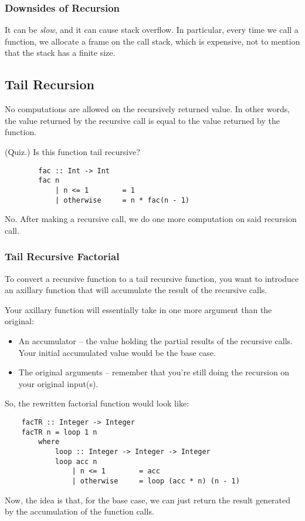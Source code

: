 \documentclass[letterpaper]{article}
\begin{document}
\subsubsection{Downsides of Recursion}
It can be \emph{slow}, and it can cause stack overflow. In particular, every time we call a function, we allocate a frame on the call stack, which is expensive, not to mention that the stack has a finite size. 

\subsection{Tail Recursion}
No computations are allowed on the recursively returned value. In other words, the value returned by the recursive call is equal to the value returned by the function. 

\begin{mdframed}[]
    (Quiz.) Is this function tail recursive?
    \begin{verbatim}
        fac :: Int -> Int 
        fac n 
            | n <= 1        = 1
            | otherwise     = n * fac(n - 1)
    \end{verbatim}

    \begin{mdframed}[]
        No. After making a recursive call, we do one more computation on said recursion call. 
    \end{mdframed}
\end{mdframed}


\subsubsection{Tail Recursive Factorial}
To convert a recursive function to a tail recursive function, you want to introduce an axillary function that will accumulate the result of the recursive calls. 

\bigskip 

Your axillary function will essentially take in one more argument than the original: 
\begin{itemize}
    \item An accumulator -- the value holding the partial results of the recursive calls. Your initial accumulated value would be the base case.
    \item The original arguments -- remember that you're still doing the recursion on your original input(s).
\end{itemize}

So, the rewritten factorial function would look like: 
\begin{verbatim}
    facTR :: Integer -> Integer 
    facTR n = loop 1 n  
        where 
            loop :: Integer -> Integer -> Integer
            loop acc n 
                | n <= 1        = acc 
                | otherwise     = loop (acc * n) (n - 1)
\end{verbatim}
Now, the idea is that, for the base case, we can just return the result generated by the accumulation of the function calls. 
\end{document}
